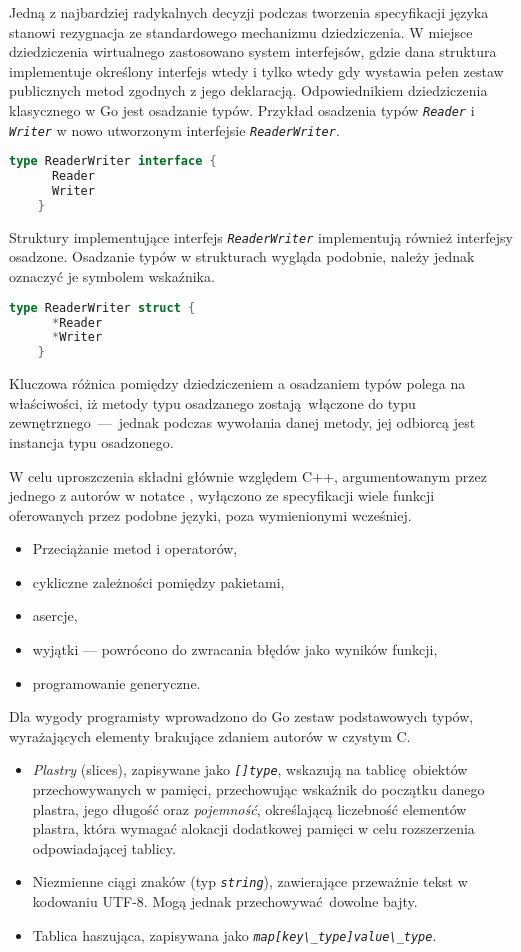   \par{
  Jedną z najbardziej radykalnych decyzji podczas tworzenia specyfikacji języka stanowi rezygnacja ze standardowego mechanizmu dziedziczenia. W miejsce dziedziczenia wirtualnego zastosowano system interfejsów, gdzie dana struktura implementuje określony interfejs wtedy i tylko wtedy gdy wystawia pełen zestaw publicznych metod zgodnych z jego deklaracją. Odpowiednikiem dziedziczenia klasycznego w Go jest osadzanie typów.
  Przykład osadzenia typów \textit{\lstinline{Reader}} i \textit{\lstinline{Writer}} w nowo utworzonym interfejsie \textit{\lstinline{ReaderWriter}}.
  \begin{lstlisting}[language=go]
    type ReaderWriter interface {
      Reader
      Writer
    }
  \end{lstlisting}
  Struktury implementujące interfejs \textit{\lstinline{ReaderWriter}} implementują również interfejsy osadzone.
  Osadzanie typów w strukturach wygląda podobnie, należy jednak oznaczyć je symbolem wskaźnika.
  \begin{lstlisting}[language=go]
    type ReaderWriter struct {
      *Reader
      *Writer
    }
  \end{lstlisting}
  Kluczowa różnica pomiędzy dziedziczeniem a osadzaniem typów polega na właściwości, iż metody typu osadzanego zostają włączone do typu zewnętrznego~---~jednak podczas wywołania danej metody, jej odbiorcą jest instancja typu osadzonego. \cite{godoc:embedding}
}
\par {
W celu uproszczenia składni głównie względem C++, argumentowanym przez jednego z autorów w notatce \cite{Pike:LessIsMore}, wyłączono ze specyfikacji wiele funkcji oferowanych przez podobne języki, poza wymienionymi wcześniej.
  \begin{itemize}
    \item Przeciążanie metod i operatorów,
    \item cykliczne zależności pomiędzy pakietami,
    \item asercje,
    \item wyjątki --- powrócono do zwracania błędów jako wyników funkcji,
    \item programowanie generyczne.
  \end{itemize}
}
\par{
  Dla wygody programisty wprowadzono do Go zestaw podstawowych typów, wyrażających elementy brakujące zdaniem autorów w czystym C.
  \begin{itemize}
    \item \emph{Plastry} (slices), zapisywane jako \textit{\lstinline{[]type}}, wskazują na tablicę obiektów przechowywanych w pamięci, przechowując wskaźnik do początku danego plastra, jego długość oraz \emph{pojemność}, określającą liczebność elementów plastra, która wymagać alokacji dodatkowej pamięci w celu rozszerzenia odpowiadającej tablicy.
    \item Niezmienne ciągi znaków (typ \textit{\lstinline{string}}), zawierające przeważnie tekst w kodowaniu UTF-8. Mogą jednak przechowywać dowolne bajty.
    \item Tablica haszująca, zapisywana jako \textit{\lstinline{map[key\_type]value\_type}}.
  \end{itemize}
}

